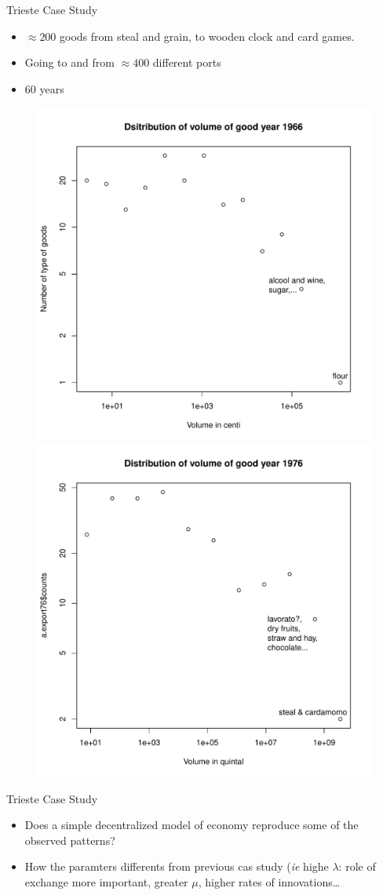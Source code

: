 \documentclass[12pt, notes=show]{beamer}
\begin{document}
\begin{frame}{Trieste Case Study}
    \begin{itemize}
	\item $\approx 200$ goods from steal and grain, to wooden clock and card games.
	\item Going to and from $\approx 400$ different ports
	\item 60 years
    \end{itemize}
    \begin{figure}[h]
	\includegraphics[width=.45\textwidth]{images/distribgood66.pdf}
	\includegraphics[width=.45\textwidth]{images/distribgood76.pdf}
    \end{figure}
\end{frame}

\begin{frame}{Trieste Case Study}
    \begin{itemize}
	\item Does a simple decentralized model of economy reproduce some of the observed patterns?
	\item How the paramters differents from previous cas study (\emph{ie} highe $\lambda$: role of exchange more important, greater $\mu$, higher rates of innovations\dots
    \end{itemize}
\end{frame}
\end{document}
